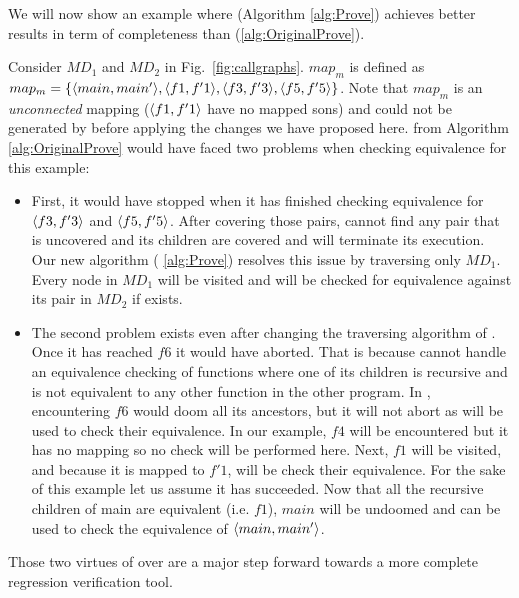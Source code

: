 We will now show an example where  (Algorithm \ref{alg:Prove}) achieves better results in term of completeness than  (\ref{alg:OriginalProve}). 

Consider $MD_1$ and $MD_2$ in Fig.~\ref{fig:callgraphs}. $map_m$ is defined as $map_m = \{ \langle main,main'\rangle,\langle f1,f'1\rangle, \langle f3,f'3\rangle,\langle f5,f'5\rangle\}$. Note that $map_m$ is an \emph{unconnected} mapping ($\langle f1,f'1\rangle$ have no mapped sons) and could not be generated by  before applying the changes we have proposed here.  from Algorithm \ref{alg:OriginalProve} would have faced two problems when checking equivalence for this example:
\begin{itemize}
    \item 
First, it would have stopped when it has finished checking equivalence for $\langle f3,f'3\rangle$ and $\langle f5,f'5\rangle$. After covering those pairs,  cannot find any pair that is uncovered and its children are covered and will terminate its execution. Our new algorithm  ( \ref{alg:Prove}) resolves this issue by traversing only $MD_1$. Every node in $MD_1$ will be visited and will be checked for equivalence against its pair in $MD_2$ if exists. 
\item The second problem exists even after changing the traversing algorithm of . Once it has reached $f6$ it would have aborted. That is because  cannot handle an equivalence checking of functions where one of its children is recursive and is not equivalent to any other function in the other program. In , encountering $f6$ would doom all its ancestors, but it will not abort as  will be used to check their equivalence. In our example, $f4$ will be encountered but it has no mapping so no check will be performed here. Next, $f1$ will be visited, and because it is mapped to $f'1$,  will be check their equivalence. For the sake of this example let us assume it has succeeded. Now that all the recursive children of main are equivalent (i.e. $f1$), $main$ will be undoomed and  can be used to check the equivalence of $\langle main,main'\rangle$.
\end{itemize}



Those two virtues of  over  are a major step forward towards a more complete regression verification tool.


